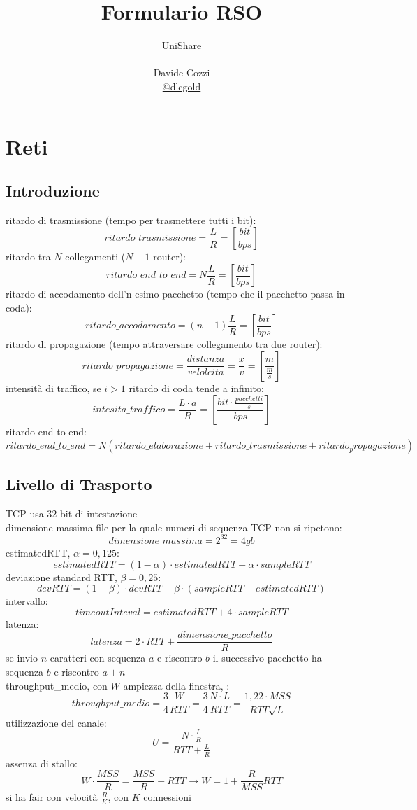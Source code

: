 \documentclass[a4paper,12pt, oneside]{book}
\title{Formulario RSO}
\author{UniShare\\\\Davide Cozzi\\\href{https://t.me/dlcgold}{@dlcgold}}
\date{}
\begin{document}
\maketitle


\newtheorem{teorema}{Teorema}
\newtheorem{definizione}{Definizione}
\newtheorem{esempio}{Esempio}
\newtheorem{corollario}{Corollario}
\newtheorem{lemma}{Lemma}
\newtheorem{osservazione}{Osservazione}
\newtheorem{nota}{Nota}
\newtheorem{esercizio}{Esercizio}
\tableofcontents

\renewcommand{\chaptermark}[1]{%
	\markboth{\chaptername
		\ \thechapter.\ #1}{}}
\renewcommand{\sectionmark}[1]{\markright{\thesection.\ #1}}
\chapter{Reti}
\section{Introduzione}
ritardo di trasmissione  (tempo per trasmettere tutti i bit):
$$ritardo\_trasmissione=\frac{L}{R}=\left[\frac{bit}{bps}\right]$$
ritardo tra $N$ collegamenti ($N-1$ router):
$$ritardo\_end\_to\_end=N\frac{L}{R}=\left[\frac{bit}{bps}\right]$$
ritardo di accodamento dell'n-esimo pacchetto (tempo che il pacchetto passa in coda):
$$ritardo\_accodamento=(n-1)\frac{L}{R}=\left[\frac{bit}{bps}\right]$$
ritardo di propagazione (tempo attraversare collegamento tra due router):
$$ritardo\_propagazione=\frac{distanza}{velolcita}=\frac{x}{v}=\left[\frac{m}{\frac{m}{s}}\right]$$
intensità di traffico, se $i>1$ ritardo di coda tende a infinito:
$$intesita\_traffico=\frac{L\cdot a}{R}=\left[\frac{bit\cdot \frac{pacchetti}{s}}{bps}\right]$$
ritardo end-to-end:
$$ritardo\_end\_to\_end=N(ritardo\_elaborazione+ritardo\_trasmissione+ritardo_propagazione)$$
\section{Livello di Trasporto}
TCP usa 32 bit di intestazione\\
dimensione massima file per la quale numeri di sequenza TCP non si ripetono:
$$dimensione\_massima=2^{32}=4gb$$
estimatedRTT, $\alpha=0,125$:
$$estimatedRTT=(1-\alpha)\cdot estimatedRTT+\alpha\cdot sampleRTT$$
deviazione standard RTT, $\beta=0,25$:
$$devRTT=(1-\beta)\cdot devRTT+\beta\cdot (sampleRTT-estimatedRTT)$$
intervallo:
$$timeoutInteval=estimatedRTT+4\cdot sampleRTT$$
latenza:
$$latenza=2\cdot RTT+\frac{dimensione\_pacchetto}{R}$$
se invio $n$ caratteri con sequenza $a$ e riscontro $b$ il successivo pacchetto ha sequenza $b$ e riscontro $a+n$\\
throughput\_medio, con $W$ ampiezza della finestra, :
$$throughput\_medio=\frac{3}{4}\frac{W}{RTT}=\frac{3}{4}\frac{N\cdot L}{RTT}=\frac{1,22\cdot MSS}{RTT\sqrt{L}}$$
utilizzazione del canale:
$$U=\frac{N\cdot \frac{L}{R}}{RTT+\frac{L}{R}}$$
assenza di stallo:
$$W\cdot \frac{MSS}{R}=\frac{MSS}{R}+RTT\to W=1+\frac{R}{MSS}RTT$$
si ha fair con velocità $\frac{R}{K}$, con $K$ connessioni
\newpage
\end{document}
